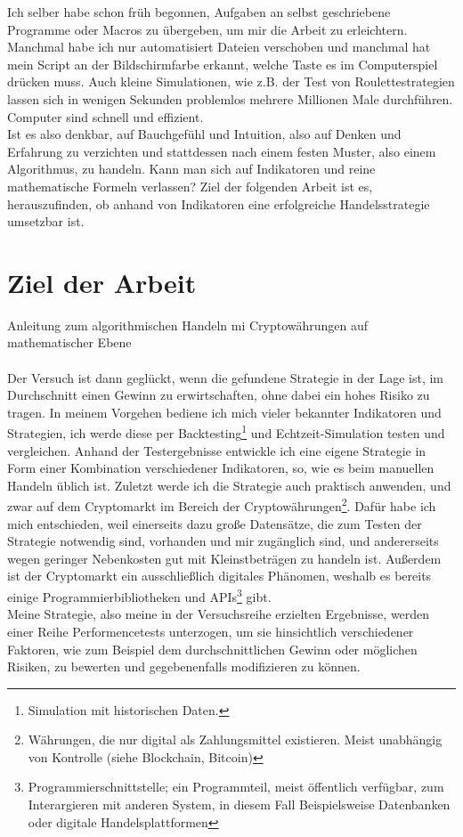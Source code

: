 \documentclass[12pt]{article}
\begin{document}
	Ich selber habe schon früh begonnen, Aufgaben an selbst geschriebene Programme oder Macros zu übergeben, um mir die Arbeit zu erleichtern. Manchmal habe ich nur automatisiert Dateien verschoben und manchmal hat mein Script an der Bildschirmfarbe erkannt, welche Taste es im Computerspiel drücken muss. Auch kleine Simulationen, wie z.B. der Test von Roulettestrategien lassen sich in wenigen Sekunden problemlos mehrere Millionen Male durchführen. Computer sind schnell und effizient.\\
	Ist es also denkbar, auf Bauchgefühl und Intuition, also auf Denken und Erfahrung zu verzichten und stattdessen nach einem festen Muster, also einem Algorithmus, zu handeln. Kann man sich auf Indikatoren und reine mathematische Formeln verlassen? Ziel der folgenden Arbeit ist es, herauszufinden, ob anhand von Indikatoren eine erfolgreiche Handelsstrategie umsetzbar ist.

\section{Ziel der Arbeit}
	Anleitung zum algorithmischen Handeln mi Cryptowährungen auf mathematischer Ebene\\\\
	Der Versuch ist dann geglückt, wenn die gefundene Strategie in der Lage ist, im Durchschnitt einen Gewinn zu erwirtschaften, ohne dabei ein hohes Risiko zu tragen. In meinem Vorgehen bediene ich mich vieler bekannter Indikatoren und Strategien, ich werde diese per Backtesting\footnote{Simulation mit historischen Daten.} und Echtzeit-Simulation testen und vergleichen. Anhand der Testergebnisse entwickle ich eine eigene Strategie in Form einer Kombination verschiedener Indikatoren, so, wie es beim manuellen Handeln üblich ist. Zuletzt werde ich die Strategie auch praktisch anwenden, und zwar auf dem Cryptomarkt im Bereich der Cryptowährungen\footnote{Währungen, die nur digital als Zahlungsmittel existieren. Meist unabhängig von Kontrolle (siehe Blockchain, Bitcoin)}. Dafür habe ich mich entschieden, weil einerseits dazu große Datensätze, die zum Testen der Strategie notwendig sind, vorhanden und mir zugänglich sind, und andererseits wegen geringer Nebenkosten gut mit Kleinstbeträgen zu handeln ist. Außerdem ist der Cryptomarkt ein ausschließlich digitales Phänomen, weshalb es bereits einige Programmierbibliotheken und APIs\footnote{\glqq Programmierschnittstelle\grqq{}; ein Programmteil, meist öffentlich verfügbar, zum Interargieren mit anderen System, in diesem Fall Beispielsweise Datenbanken oder digitale Handelsplattformen} gibt.\\
	Meine Strategie, also meine in der Versuchsreihe erzielten Ergebnisse, werden einer Reihe Performencetests unterzogen, um sie hinsichtlich verschiedener Faktoren, wie zum Beispiel dem durchschnittlichen Gewinn oder möglichen Risiken, zu bewerten und gegebenenfalls modifizieren zu können.
	
\end{document}
